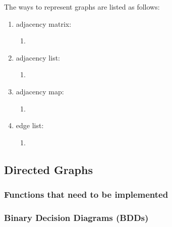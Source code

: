 The ways to represent graphs are listed as follows: \vspace{-0.3cm}
\begin{enumerate} \itemsep -4pt
\item adjacency matrix: \vspace{-0.3cm}
	\begin{enumerate} \itemsep -2pt
	\item 
	\end{enumerate}
\item adjacency list: \vspace{-0.3cm}
	\begin{enumerate} \itemsep -2pt
	\item 
	\end{enumerate}
\item adjacency map: \vspace{-0.3cm}
	\begin{enumerate} \itemsep -2pt
	\item 
	\end{enumerate}
\item edge list: \vspace{-0.3cm}
	\begin{enumerate} \itemsep -2pt
	\item 
	\end{enumerate}
\end{enumerate}









\subsection{Directed Graphs}
\label{ssec:DirectedGraphs}



\subsubsection{Functions that need to be implemented}
\label{sssec:FunctionsThatNeedToBeImplemented}





\subsubsection{Binary Decision Diagrams (BDDs)}
\label{sssec:BinaryDecisionDiagramsBDDs}




